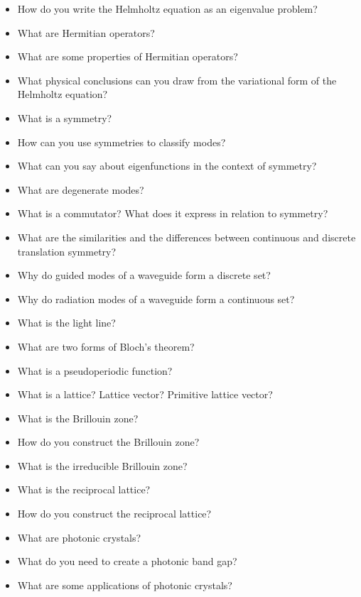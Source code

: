 \begin{itemize}
\item How do you write the Helmholtz equation as an eigenvalue problem?
\item What are Hermitian operators?
\item What are some properties of Hermitian operators?
\item What physical conclusions can you draw from the variational form of the Helmholtz equation?
\item What is a symmetry?
\item How can you use symmetries to classify modes?
\item What can you say about eigenfunctions in the context of symmetry? 
\item What are degenerate modes?
\item What is a commutator? What does it express in relation to symmetry?
\item What are the similarities and the differences between continuous and discrete translation symmetry?
\item Why do guided modes of a waveguide form a discrete set?  
\item Why do radiation modes of a waveguide form a continuous set?
\item What is the light line?
\item What are two forms of Bloch's theorem?
\item What is a pseudoperiodic function?
\item What is a lattice? Lattice vector? Primitive lattice vector?
\item What is the Brillouin zone?
\item How do you construct the Brillouin zone?  
\item What is the irreducible Brillouin zone?  
\item What is the reciprocal lattice?
\item How do you construct the reciprocal lattice?
\item What are photonic crystals?
\item What do you need to create a photonic band gap?  
\item What are some applications of photonic crystals?  
\end{itemize}





